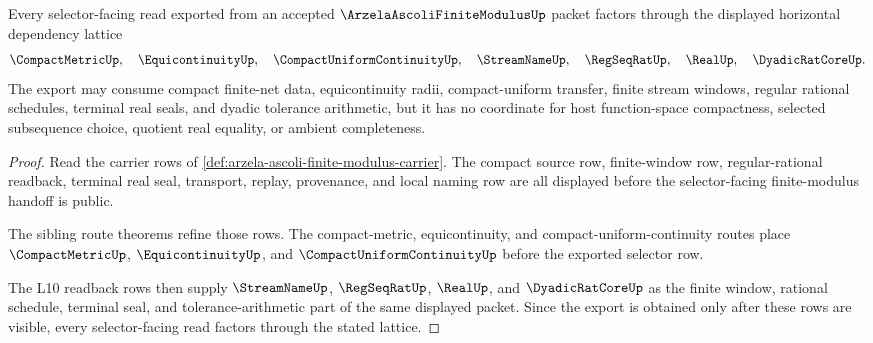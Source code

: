\begin{theorem}
\label{thm:arzela-ascoli-finite-modulus-sibling-dependency}
Every selector-facing read exported from an accepted $\ArzelaAscoliFiniteModulusUp$ packet factors through the displayed horizontal dependency lattice
$$
\CompactMetricUp,\quad
\EquicontinuityUp,\quad
\CompactUniformContinuityUp,\quad
\StreamNameUp,\quad
\RegSeqRatUp,\quad
\RealUp,\quad
\DyadicRatCoreUp.
$$
The export may consume compact finite-net data, equicontinuity radii, compact-uniform transfer, finite stream windows, regular rational schedules, terminal real seals, and dyadic tolerance arithmetic, but it has no coordinate for host function-space compactness, selected subsequence choice, quotient real equality, or ambient completeness.
\end{theorem}
\begin{proof}
Read the carrier rows of \autoref{def:arzela-ascoli-finite-modulus-carrier}. The compact source row, finite-window row, regular-rational readback, terminal real seal, transport, replay, provenance, and local naming row are all displayed before the selector-facing finite-modulus handoff is public.

The sibling route theorems refine those rows. The compact-metric, equicontinuity, and compact-uniform-continuity routes place $\CompactMetricUp$, $\EquicontinuityUp$, and $\CompactUniformContinuityUp$ before the exported selector row.

The L10 readback rows then supply $\StreamNameUp$, $\RegSeqRatUp$, $\RealUp$, and $\DyadicRatCoreUp$ as the finite window, rational schedule, terminal seal, and tolerance-arithmetic part of the same displayed packet. Since the export is obtained only after these rows are visible, every selector-facing read factors through the stated lattice.
\end{proof}
